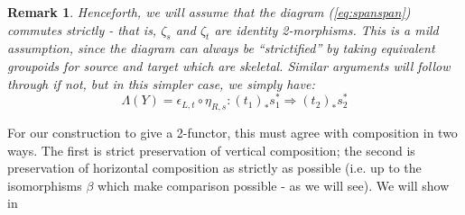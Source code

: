 \documentclass[10pt]{amsart}
\numberwithin{theorem}{subsection}
\newtheorem{varremark}[theorem]{Remark}
\newenvironment{remark}{\begin{varremark}\em}{\em\end{varremark}}
\newcommand{\FV}{\Lambda}
\begin{document}
\begin{remark}Henceforth, we will assume that the diagram (\ref{eq:spanspan})
commutes strictly - that is, $\zeta_s$ and $\zeta_t$ are identity
2-morphisms.  This is a mild assumption, since the diagram can always
be ``strictified'' by taking equivalent groupoids for source and
target which are skeletal.  Similar arguments will follow through if
not, but in this simpler case, we simply have:
\begin{equation}
\FV(Y) = \epsilon_{L,t} \circ \eta_{R,s} : (t_1)_{\ast} s_1^{\ast} \Longrightarrow (t_2)_{\ast} s_2^{\ast}
\end{equation}
\end{remark}

For our construction to give a 2-functor, this must agree with
composition in two ways. The first is strict preservation of vertical
composition; the second is preservation of horizontal composition as
strictly as possible (i.e. up to the isomorphisms $\beta$ which make
comparison possible - as we will see).  We will show in 
\end{document}
